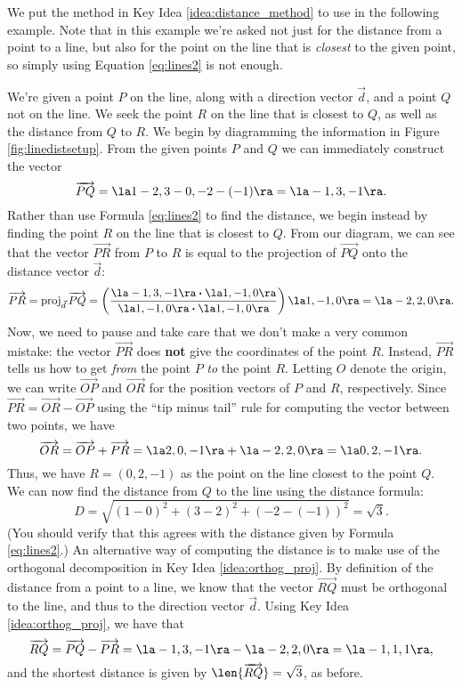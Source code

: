 We put the method in Key Idea \ref{idea:distance_method} to use in the following example. Note that in this example we're asked not just for the distance from a point to a line, but also for the point on the line that is \textit{closest} to the given point, so simply using Equation \eqref{eq:lines2} is not enough.


{We're given a point $P$ on the line, along with a direction vector $\vec d$, and a point $Q$ not on the line. We seek the point $R$ on the line that is closest to $Q$, as well as the distance from $Q$ to $R$. We begin by diagramming the information in Figure \ref{fig:linedistsetup}. From the given points $P$ and $Q$ we can immediately construct the vector
\[
\overrightarrow{PQ}=\la 1-2, 3-0, -2-(-1)\ra = \la -1, 3, -1\ra.
\]
Rather than use Formula \eqref{eq:lines2} to find the distance, we begin instead by finding the point $R$ on the line that is closest to $Q$. From our diagram, we can see that the vector $\overrightarrow{PR}$ from $P$ to $R$ is equal to the projection of $\overrightarrow{PQ}$ onto the distance vector $\vec{d}$:
\[
\overrightarrow{PR}=\operatorname{proj}_{\vec{d}}\overrightarrow{PQ}= \left(\frac{\la -1,3,-1\ra\boldsymbol{\cdot}\la 1,-1,0\ra}{\la 1,-1,0\ra\boldsymbol{\cdot}\la 1,-1,0\ra}\right)\la 1,-1,0\ra = \la -2,2,0\ra.
\]
Now, we need to pause and take care that we don't make a very common mistake: the vector $\overrightarrow{PR}$ does \textbf{not} give the coordinates of the point $R$. Instead, $\overrightarrow{PR}$ tells us how to get \textit{from} the point $P$ \textit{to} the point $R$. Letting $O$ denote the origin, we can write $\overrightarrow{OP}$ and $\overrightarrow{OR}$ for the position vectors of $P$ and $R$, respectively. Since $\overrightarrow{PR} = \overrightarrow{OR}-\overrightarrow{OP}$ using the ``tip minus tail'' rule for computing the vector between two points, we have
\[
\overrightarrow{OR} = \overrightarrow{OP}+\overrightarrow{PR} = \la 2, 0, -1\ra + \la -2, 2, 0\ra = \la 0, 2, -1\ra.
\]
Thus, we have $R=(0,2,-1)$ as the point on the line closest to the point $Q$. We can now find the distance from $Q$ to the line using the distance formula:
\[
D= \sqrt{(1-0)^2+(3-2)^2+(-2-(-1))^2} = \sqrt{3}.
\]
(You should verify that this agrees with the distance given by Formula \eqref{eq:lines2}.)
An alternative way of computing the distance is to make use of the orthogonal decomposition in Key Idea \ref{idea:orthog_proj}. By definition of the distance from a point to a line, we know that the vector $\overrightarrow{RQ}$ must be orthogonal to the line, and thus to the direction vector $\vec{d}$. Using Key Idea \ref{idea:orthog_proj}, we have that
\[
\overrightarrow{RQ}= \overrightarrow{PQ}-\overrightarrow{PR} = \la -1, 3, -1\ra - \la -2, 2, 0\ra = \la -1, 1, 1\ra,
\]
and the shortest distance is given by $\len{\overrightarrow{RQ}}=\sqrt{3}$, as before.
}\\
